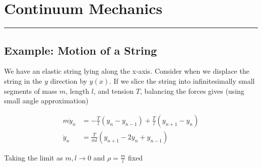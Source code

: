 \documentclass[12pt]{article}
\begin{document}
\setcounter{section}{8}
\section{Continuum Mechanics}
\par\noindent\rule{\textwidth}{1pt}
\subsection{Example: Motion of a String}
We have an elastic string lying along the x-axis. Consider when we displace the string in the $y$ direction by $y(x)$. If we slice the string into infinitesimally small segments of mass $m$, length $l$, and tension $T$, balancing the forces gives (using small angle approximation)

\begin{equation}
	\begin{aligned}
		m\ddot{y}_n &= -\frac{T}{l}(y_n - y_{n-1}) + \frac{T}{l}(y_{n+1} - y_n)\\
		\ddot{y}_n &= \frac{T}{ml}(y_{n+1} - 2y_n + y_{n-1})
	\end{aligned}
\end{equation}

Taking the limit as $m, l \to 0$ and $\rho = \frac{m}{l}$ fixed
\end{document}
